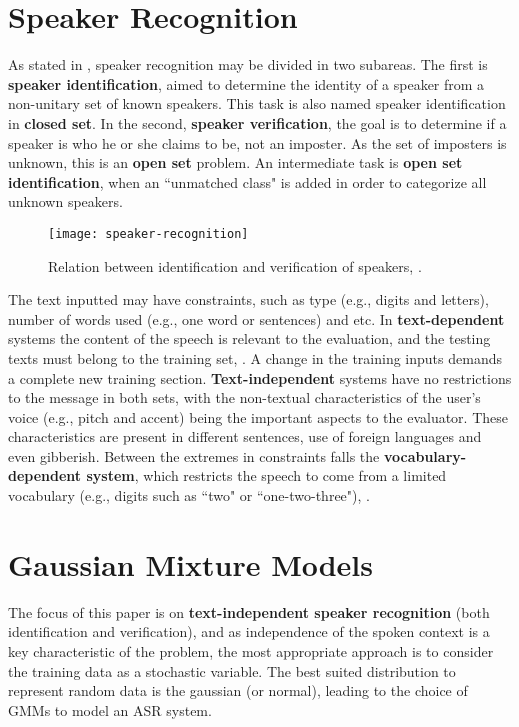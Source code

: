 \section{Speaker Recognition}
\label{sec:speaker-recognition}

As stated in , speaker recognition may be divided in two subareas. The first is \textbf{speaker identification}, aimed to determine the identity of a speaker from a non-unitary set of known speakers. This task is also named speaker identification in \textbf{closed set}. In the second, \textbf{speaker verification}, the goal is to determine if a speaker is who he or she claims to be, not an imposter. As the set of imposters is unknown, this is an \textbf{open set} problem. An intermediate task is \textbf{open set identification}, when an ``unmatched class" is added in order to categorize all unknown speakers.

\begin{figure}[ht]
    \centering
    \texttt{[image: speaker-recognition]}
    \caption{Relation between identification and verification of speakers, .}
    \label{fig:speaker-recognition}
\end{figure}

The text inputted may have constraints, such as type (e.g., digits and letters), number of words used (e.g., one word or sentences) and etc. In \textbf{text-dependent} systems the content of the speech is relevant to the evaluation, and the testing texts must belong to the training set, . A change in the training inputs demands a complete new training section. \textbf{Text-independent} systems have no restrictions to the message in both sets, with the non-textual characteristics of the user's voice (e.g., pitch and accent) being the important aspects to the evaluator. These characteristics are present in different sentences, use of foreign languages and even gibberish. Between the extremes in constraints falls the \textbf{vocabulary-dependent system}, which restricts the speech to come from a limited vocabulary (e.g., digits such as ``two" or ``one-two-three"), .

\section{Gaussian Mixture Models}
\label{sec:gmm}

The focus of this paper is on \textbf{text-independent speaker recognition} (both identification and verification), and as independence of the spoken context is a key characteristic of the problem, the most appropriate approach is to consider the training data as a stochastic variable. The best suited distribution to represent random data is the gaussian (or normal), leading to the choice of GMMs to model an ASR system.

